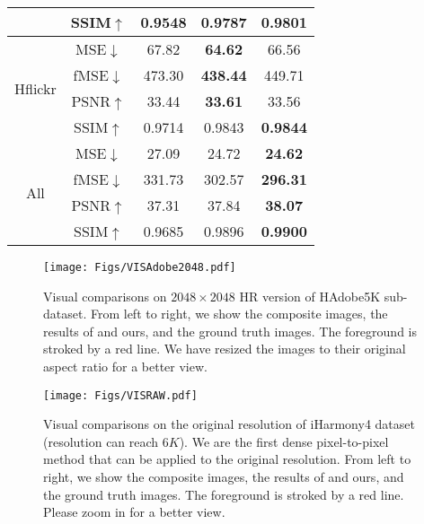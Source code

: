 \documentclass[10pt,journal,twocolumn,twoside]{IEEEtran}
\begin{document}
\begin{table*}[t]
{\begin{tabular}{c|c|cc|c}
           & SSIM$\uparrow$   & 0.9548          & 0.9787          & \textbf{0.9801} \\ \hline
\multirow{4}{*}{Hflickr}    & MSE$\downarrow$    & 67.82           & \textbf{64.62}  & 66.56           \\
           & fMSE$\downarrow$   & 473.30          & \textbf{438.44} & 449.71          \\
           & PSNR$\uparrow$   & 33.44           & \textbf{33.61}  & 33.56           \\
           & SSIM$\uparrow$   & 0.9714          & 0.9843          & \textbf{0.9844} \\ \hline
\multirow{4}{*}{All}        & MSE$\downarrow$    & 27.09           & 24.72           & \textbf{24.62}  \\
           & fMSE$\downarrow$   & 331.73          & 302.57          & \textbf{296.31} \\
           & PSNR$\uparrow$   & 37.31           & 37.84           & \textbf{38.07}  \\
           & SSIM$\uparrow$   & 0.9685          & 0.9896          & \textbf{0.9900} \\ \hline
\end{tabular}}
\end{table*}

\begin{figure*}[!ht]
 \centering
   \begin{minipage}[t]{0.44\linewidth}
  \centering
   \texttt{[image: Figs/VISAdobe2048.pdf]}
   \caption{Visual comparisons on $2048\times 2048$ HR version of HAdobe5K sub-dataset. From left to right, we show the composite images, the results of \cite{cong2022high} and ours, and the ground truth images. The foreground is stroked by a red line. We have resized the images to their original aspect ratio for a better view.}
   \label{fig:VISAdobe2048}
\end{minipage}
\hspace{1em}
 \begin{minipage}[t]{0.51\linewidth}
  \centering
   \texttt{[image: Figs/VISRAW.pdf]}
   \caption{Visual comparisons on the original resolution of iHarmony4 dataset (resolution can reach $6K$). We are the first dense pixel-to-pixel method that can be applied to the original resolution. From left to right, we show the composite images, the results of \cite{ke2022harmonizer, xue2022dccf} and ours, and the ground truth images. The foreground is stroked by a red line. Please zoom in for a better view.}
   \label{fig:VISRAW}
   \end{minipage}
\end{figure*}
\end{document}
